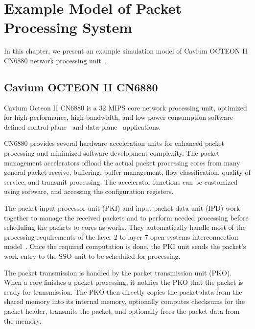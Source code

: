 \chapter{Example Model of Packet Processing System}
\label{chapter:example-simulation-model}
In this chapter, we present an example simulation model of Cavium OCTEON II CN6880 network processing unit~\cite{Cavium OCTEON}.


\section{Cavium OCTEON II CN6880}
\label{sec:cavium-octeon}

Cavium Octeon II CN6880 is a 32 MIPS core network processing unit, optimized for high-performance, high-bandwidth, and low power consumption software-defined control-plane~\cite{control-plane} and data-plane~\cite{data-plane} applications.

CN6880 provides several hardware acceleration units for enhanced packet processing and minimized software development complexity. The packet management accelerators offload the actual packet processing cores from many general packet receive, buffering, buffer management, flow classification, quality of service, and transmit processing. The accelerator functions can be customized using software, and accessing the configuration registers.~\cite{cavium:2010:fundamentals}

The packet input processor unit (PKI) and input packet data unit (IPD) work together to manage the received packets and to perform needed processing before scheduling the packets to cores as works. They automatically handle most of the processing requirements of the layer 2 to layer 7 open systems interconnection model~\cite{OSI model}. Once the required computation is done, the PKI unit sends the packet's work entry to the SSO unit to be scheduled for processing.~\cite{cavium:2010:fundamentals}

The packet transmission is handled by the packet transmission unit (PKO). When a core finishes a packet processing, it notifies the PKO that the packet is ready for transmission. The PKO then directly copies the packet data from the shared memory into its internal memory, optionally computes checksums for the packet header, transmits the packet, and optionally frees the packet data from the memory.~\cite{cavium:2010:fundamentals}

